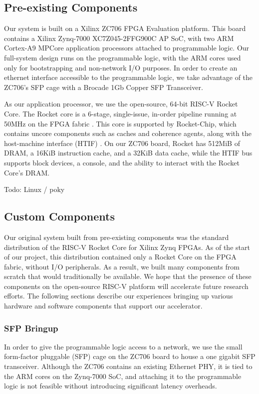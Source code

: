 \subsection{Pre-existing Components}
    Our system is built on a Xilinx ZC706 FPGA Evaluation platform. This board
    contains a Xilinx Zynq-7000 XC7Z045-2FFG900C AP SoC, with two ARM Cortex-A9
    MPCore application processors attached to programmable logic. Our full-system
    design runs on the programmable logic, with the ARM cores used only for 
    bootstrapping and non-network I/O purposes. In order to create an ethernet interface accessible
    to the programmable logic, we take advantage of the ZC706's SFP cage with a 
    Brocade 1Gb Copper SFP Transceiver.

    As our application processor, we use the open-source, 64-bit RISC-V Rocket Core. 
    The Rocket core is a
    6-stage, single-issue, in-order pipeline running at 50MHz on the FPGA fabric . This 
    core is supported by Rocket-Chip, which contains uncore components such as
    caches and coherence agents, along with the host-machine interface (HTIF) \cite{rocket}.
    On our ZC706 board, Rocket has 512MiB of DRAM, a 16KiB instruction cache, and a 
    32KiB data cache, while the HTIF bus supports block devices, a console, and 
    the ability to interact with the Rocket Core's DRAM.

Todo: Linux / poky



\subsection{Custom Components}
    Our original system built from pre-existing components was the standard
    distribution of the RISC-V Rocket Core for Xilinx Zynq FPGAs. As of the 
    start of our project, this distribution contained only a Rocket Core on
    the FPGA fabric, without I/O peripherals. As a result, we built many 
    components from scratch that would traditionally be available. We hope that
    the presence of these components on the open-source RISC-V platform
    will accelerate future research efforts. The following sections describe our
    experiences bringing up various hardware and software components that support
    our accelerator.

\subsubsection {SFP Bringup}
    In order to give the programmable logic access to a network, we use 
    the small form-factor pluggable (SFP) cage on the ZC706 board to house a 
    one gigabit SFP transceiver. Although the ZC706 contains an existing Ethernet
    PHY, it is tied to the ARM cores on the Zynq-7000 SoC, and attaching it to 
    the programmable logic is not feasible without introducing significant 
    latency overheads.

